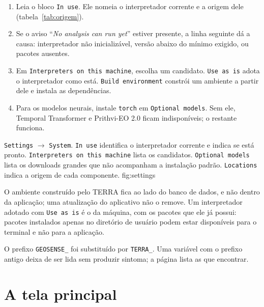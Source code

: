 \documentclass[12pt,a4paper]{article}
\newcommand{\msg}[1]{``\textit{#1}''}
\begin{document}
\begin{enumerate}[leftmargin=*,itemsep=.25em]
  \item Leia o bloco \texttt{In use}. Ele nomeia o interpretador corrente e a
        origem dele (tabela~\ref{tab:origem}).
  \item Se o aviso \msg{No analysis can run yet} estiver presente, a linha
        seguinte d\'a a causa: interpretador n\~ao inicializ\'avel, vers\~ao
        abaixo do m\'inimo exigido, ou pacotes ausentes.
  \item Em \texttt{Interpreters on this machine}, escolha um candidato.
        \texttt{Use as is} adota o interpretador como est\'a.
        \texttt{Build environment} constr\'oi um ambiente a partir dele e
        instala as depend\^encias.
  \item Para os modelos neurais, instale \texttt{torch} em
        \texttt{Optional models}. Sem ele, Temporal Transformer e Prithvi-EO
        2.0 ficam indispon\'iveis; o restante funciona.
\end{enumerate}

  {\texttt{Settings} $\rightarrow$ \texttt{System}. \texttt{In use} identifica
   o interpretador corrente e indica se est\'a pronto.
   \texttt{Interpreters on this machine} lista os candidatos.
   \texttt{Optional models} lista os downloads grandes que n\~ao acompanham a
   instala\c{c}\~ao padr\~ao. \texttt{Locations} indica a origem de cada
   componente.}
  {fig:settings}

\begin{aviso}
O ambiente constru\'ido pelo TERRA fica ao lado do banco de dados, e n\~ao
dentro da aplica\c{c}\~ao; uma atualiza\c{c}\~ao do aplicativo n\~ao o remove.
Um interpretador adotado com \texttt{Use as is} \'e o da m\'aquina, com os
pacotes que ele j\'a possui: pacotes instalados apenas no diret\'orio de
usu\'ario podem estar dispon\'iveis para o terminal e n\~ao para a
aplica\c{c}\~ao.

O prefixo \texttt{GEOSENSE\_} foi substitu\'ido por \texttt{TERRA\_}. Uma
vari\'avel com o prefixo antigo deixa de ser lida sem produzir sintoma; a
p\'agina lista as que encontrar.
\end{aviso}

\section{A tela principal}
\end{document}
